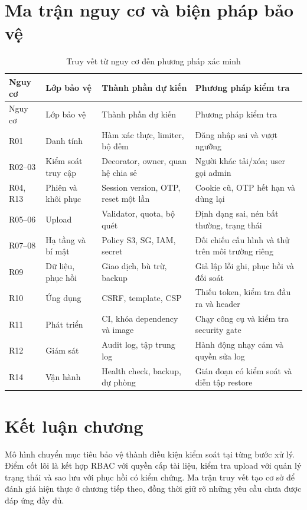 \section{Ma trận nguy cơ và biện pháp bảo vệ}
{\small\begin{longtable}{P{1.1cm}P{3.3cm}P{4.4cm}P{4cm}}
\caption{Truy vết từ nguy cơ đến phương pháp xác minh}\\\toprule
\textbf{Nguy cơ}&\textbf{Lớp bảo vệ}&\textbf{Thành phần dự kiến}&\textbf{Phương pháp kiểm tra}\\\midrule\endfirsthead
\toprule Nguy cơ&Lớp bảo vệ&Thành phần dự kiến&Phương pháp kiểm tra\\\midrule\endhead
R01 & Danh tính & Hàm xác thực, limiter, bộ đếm & Đăng nhập sai và vượt ngưỡng\\
R02--03 & Kiểm soát truy cập & Decorator, owner, quan hệ chia sẻ & Người khác tải/xóa; user gọi admin\\
R04, R13 & Phiên và khôi phục & Session version, OTP, reset một lần & Cookie cũ, OTP hết hạn và dùng lại\\
R05--06 & Upload & Validator, quota, bộ quét & Định dạng sai, nén bất thường, trạng thái\\
R07--08 & Hạ tầng và bí mật & Policy S3, SG, IAM, secret & Đối chiếu cấu hình và thử trên môi trường riêng\\
R09 & Dữ liệu, phục hồi & Giao dịch, bù trừ, backup & Giả lập lỗi ghi, phục hồi và đối soát\\
R10 & Ứng dụng & CSRF, template, CSP & Thiếu token, kiểm tra đầu ra và header\\
R11 & Phát triển & CI, khóa dependency và image & Chạy công cụ và kiểm tra security gate\\
R12 & Giám sát & Audit log, tập trung log & Hành động nhạy cảm và quyền sửa log\\
R14 & Vận hành & Health check, backup, dự phòng & Gián đoạn có kiểm soát và diễn tập restore\\\bottomrule
\end{longtable}}
\section{Kết luận chương}
Mô hình chuyển mục tiêu bảo vệ thành điều kiện kiểm soát tại từng bước xử lý. Điểm cốt lõi là kết hợp RBAC với quyền cấp tài liệu, kiểm tra upload với quản lý trạng thái và sao lưu với phục hồi có kiểm chứng. Ma trận truy vết tạo cơ sở để đánh giá hiện thực ở chương tiếp theo, đồng thời giữ rõ những yêu cầu chưa được đáp ứng đầy đủ.
